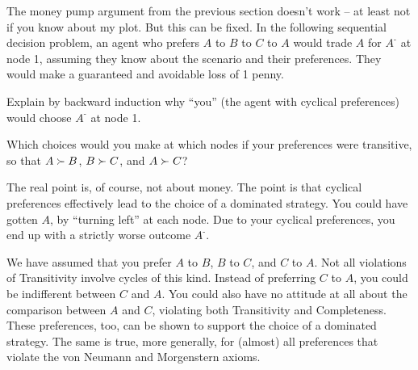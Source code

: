 The money pump argument from the previous section doesn't work -- at least not
if you know about my plot. But this can be fixed. In the following sequential
decision problem, an agent who prefers $A$ to $B$ to $C$ to $A$ would trade $A$
for $A^{\text{-}}$ at node 1, assuming they know about the scenario and their
preferences. They would make a guaranteed and avoidable loss of 1 penny.

\begin{center}
\end{center}

\begin{exercise}{2}
  Explain by backward induction why ``you'' (the agent with cyclical
  preferences) would choose $A^{\text{-}}$ at node 1.
\end{exercise}
\begin{exercise}{1}
  Which choices would you make at which nodes if your preferences were
  transitive, so that $A \succ B$, $B \succ C$, and $A \succ C$?
\end{exercise}

The real point is, of course, not about money. The point is that cyclical
preferences effectively lead to the choice of a dominated strategy. You could
have gotten $A$, by ``turning left'' at each node. Due to your cyclical
preferences, you end up with a strictly worse outcome $A^{\text{-}}$.

We have assumed that you prefer $A$ to $B$, $B$ to $C$, and $C$ to $A$. Not all
violations of Transitivity involve cycles of this kind. Instead of preferring
$C$ to $A$, you could be indifferent between $C$ and $A$. You could also have no
attitude at all about the comparison between $A$ and $C$, violating both
Transitivity and Completeness. These preferences, too, can be shown to support
the choice of a dominated strategy. The same is true, more generally, for
(almost) all preferences that violate the von Neumann and Morgenstern axioms.

